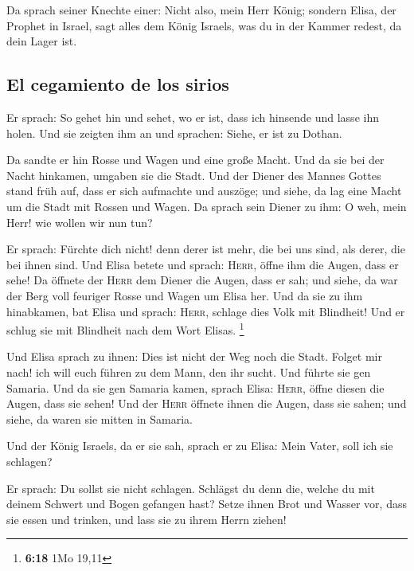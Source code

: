  Da sprach seiner Knechte einer: Nicht also, mein Herr
König; sondern Elisa, der Prophet in Israel, sagt alles dem König
Israels, was du in der Kammer redest, da dein Lager ist.

\hypertarget{el-cegamiento-de-los-sirios}{%
\subsection{El cegamiento de los
sirios}\label{el-cegamiento-de-los-sirios}}

 Er sprach: So gehet hin und sehet, wo er ist, dass ich
hinsende und lasse ihn holen. Und sie zeigten ihm an und sprachen:
Siehe, er ist zu Dothan.

 Da sandte er hin Rosse und Wagen und eine große Macht.
Und da sie bei der Nacht hinkamen, umgaben sie die Stadt.
 Und der Diener des Mannes Gottes stand früh auf, dass er
sich aufmachte und auszöge; und siehe, da lag eine Macht um die Stadt
mit Rossen und Wagen. Da sprach sein Diener zu ihm: O weh, mein Herr!
wie wollen wir nun tun?

 Er sprach: Fürchte dich nicht! denn derer ist mehr, die
bei uns sind, als derer, die bei ihnen sind.  Und Elisa
betete und sprach: \textsc{Herr}, öffne ihm die Augen, dass er sehe! Da
öffnete der \textsc{Herr} dem Diener die Augen, dass er sah; und siehe,
da war der Berg voll feuriger Rosse und Wagen um Elisa her.
 Und da sie zu ihm hinabkamen, bat Elisa und sprach:
\textsc{Herr}, schlage dies Volk mit Blindheit! Und er schlug sie mit
Blindheit nach dem Wort Elisas. \footnote{\textbf{6:18} 1Mo 19,11}

 Und Elisa sprach zu ihnen: Dies ist nicht der Weg noch
die Stadt. Folget mir nach! ich will euch führen zu dem Mann, den ihr
sucht. Und führte sie gen Samaria.  Und da sie gen
Samaria kamen, sprach Elisa: \textsc{Herr}, öffne diesen die Augen, dass
sie sehen! Und der \textsc{Herr} öffnete ihnen die Augen, dass sie
sahen; und siehe, da waren sie mitten in Samaria.

 Und der König Israels, da er sie sah, sprach er zu
Elisa: Mein Vater, soll ich sie schlagen?

 Er sprach: Du sollst sie nicht schlagen. Schlägst du
denn die, welche du mit deinem Schwert und Bogen gefangen hast? Setze
ihnen Brot und Wasser vor, dass sie essen und trinken, und lass sie zu
ihrem Herrn ziehen!

